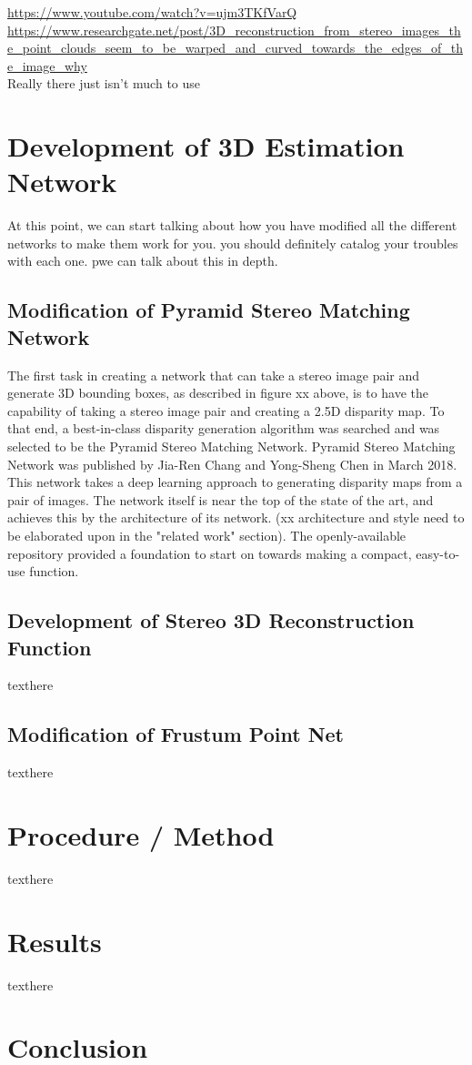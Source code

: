 \url{https://www.youtube.com/watch?v=ujm3TKfVarQ}\\
\url{https://www.researchgate.net/post/3D_reconstruction_from_stereo_images_the_point_clouds_seem_to_be_warped_and_curved_towards_the_edges_of_the_image_why}\\
Really there just isn't much to use



\section{Development of 3D Estimation Network}
At this point, we can start talking about how you have modified all the different networks to make them work for you. you should definitely catalog your troubles with each one. pwe can talk about this in depth. 

\subsection{Modification of Pyramid Stereo Matching Network}
The first task in creating a network that can take a stereo image pair and generate 3D bounding boxes, as described in figure xx above, is to have the capability of taking a stereo image pair and creating a 2.5D disparity map. To that end, a best-in-class disparity generation algorithm was searched and was selected to be the Pyramid Stereo Matching Network. Pyramid Stereo Matching Network was published by Jia-Ren Chang and Yong-Sheng Chen in March 2018. This network takes a deep learning approach to generating disparity maps from a pair of images. The network itself is near the top of the state of the art, and achieves this by the architecture of its network. (xx architecture and style need to be elaborated upon in the "related work" section). The openly-available repository provided a foundation to start on towards making a compact, easy-to-use function. 





\subsection{Development of Stereo 3D Reconstruction Function}
texthere

\subsection{Modification of Frustum Point Net}
texthere

\section{Procedure / Method}
texthere

\section{Results}
texthere

\section{Conclusion}


